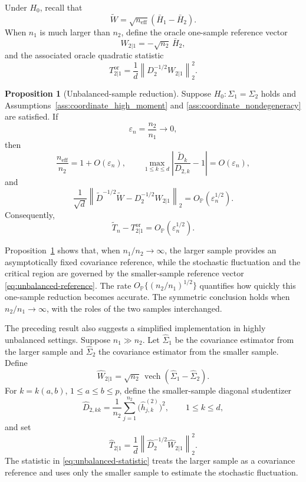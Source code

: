 \documentclass[
  12pt]{article}
\theoremstyle{plain}
\theoremstyle{definition}
\newtheorem{proposition}{Proposition}[section]
\theoremstyle{remark}
\begin{document}
Under \(H_0\), recall that
\[
\widetilde W=\sqrt{n_{\mathrm{eff}}}(\bar H_1-\bar H_2).
\]
When \(n_1\) is much larger than \(n_2\), define the oracle one-sample reference
vector
\begin{equation}
\label{eq:unbalanced-reference}
W_{2|1}=-\sqrt{n_2}\,\bar H_2,
\end{equation}
and the associated oracle quadratic statistic
\[
T_{2|1}^{\mathrm{or}}
=
\frac1d
\left\|
D_2^{-1/2}W_{2|1}
\right\|_2^2 .
\]

\begin{proposition}[Unbalanced-sample reduction]
\label{prop:unbalanced_reduction}
Suppose \(H_0:\Sigma_1=\Sigma_2\) holds and
Assumptions~\ref{ass:coordinate_high_moment} and
\ref{ass:coordinate_nondegeneracy} are satisfied.  If
\[
\varepsilon_n=\frac{n_2}{n_1}\to0,
\]
then
\[
\frac{n_{\mathrm{eff}}}{n_2}=1+O(\varepsilon_n),
\qquad
\max_{1\le k\le d}
\left|
\frac{\widetilde D_k}{D_{2,k}}-1
\right|
=
O(\varepsilon_n),
\]
and
\[
\frac1{\sqrt d}
\left\|
\widetilde D^{-1/2}\widetilde W
-
D_2^{-1/2}W_{2|1}
\right\|_2
=
O_{\mathbb P}(\varepsilon_n^{1/2}).
\]
Consequently,
\[
\widetilde T_n-T_{2|1}^{\mathrm{or}}
=
O_{\mathbb P}(\varepsilon_n^{1/2}).
\]
\end{proposition}

Proposition~\ref{prop:unbalanced_reduction} shows that, when
\(n_1/n_2\to\infty\), the larger sample provides an asymptotically fixed
covariance reference, while the stochastic fluctuation and the critical region
are governed by the smaller-sample reference vector
\eqref{eq:unbalanced-reference}.  The rate
\(O_{\mathbb P}\{(n_2/n_1)^{1/2}\}\) quantifies how quickly this one-sample
reduction becomes accurate.  The symmetric conclusion holds when
\(n_2/n_1\to\infty\), with the roles of the two samples interchanged.

The preceding result also suggests a simplified implementation in highly
unbalanced settings.  Suppose \(n_1\gg n_2\).  Let \(\widehat\Sigma_1\) be the
covariance estimator from the larger sample and \(\widehat\Sigma_2\) the
covariance estimator from the smaller sample.  Define
\[
\widehat W_{2|1}
=
\sqrt{n_2}\,
\operatorname{vech}(\widehat\Sigma_1-\widehat\Sigma_2).
\]
For \(k=k(a,b)\), \(1\le a\le b\le p\), define the smaller-sample diagonal
studentizer
\[
\widehat D_{2,kk}
=
\frac1{n_2}
\sum_{j=1}^{n_2}
\bigl(\widehat h_{j,k}^{(2)}\bigr)^2,
\qquad
1\le k\le d,
\]
and set
\begin{equation}
\label{eq:unbalanced-statistic}
\widehat T_{2|1}
=
\frac1d
\left\|
\widehat D_2^{-1/2}\widehat W_{2|1}
\right\|_2^2 .
\end{equation}
The statistic in \eqref{eq:unbalanced-statistic} treats the larger sample as a
covariance reference and uses only the smaller sample to estimate the
stochastic fluctuation.
\end{document}
